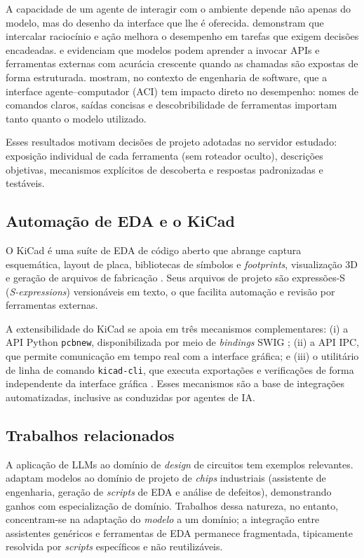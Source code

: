 A capacidade de um agente de interagir com o ambiente depende não apenas do
modelo, mas do desenho da interface que lhe é oferecida. \citet{yao2023react}
demonstram que intercalar raciocínio e ação melhora o desempenho em tarefas
que exigem decisões encadeadas. \citet{schick2023toolformer} e
\citet{patil2023gorilla} evidenciam que modelos podem aprender a invocar APIs
e ferramentas externas com acurácia crescente quando as chamadas são expostas
de forma estruturada. \citet{yang2024sweagent} mostram, no contexto de
engenharia de software, que a interface agente--computador (ACI) tem impacto
direto no desempenho: nomes de comandos claros, saídas concisas e
descobribilidade de ferramentas importam tanto quanto o modelo utilizado.

Esses resultados motivam decisões de projeto adotadas no servidor estudado:
exposição individual de cada ferramenta (sem roteador oculto), descrições
objetivas, mecanismos explícitos de descoberta e respostas padronizadas e
testáveis.

\subsection{Automação de EDA e o KiCad}

O KiCad é uma suíte de EDA de código aberto que abrange captura esquemática,
layout de placa, bibliotecas de símbolos e \emph{footprints}, visualização 3D e
geração de arquivos de fabricação \citep{kicaddocs}. Seus arquivos de projeto
são expressões-S (\emph{S-expressions}) versionáveis em texto, o que facilita
automação e revisão por ferramentas externas.

A extensibilidade do KiCad se apoia em três mecanismos complementares:
(i) a API Python \texttt{pcbnew}, disponibilizada por meio de \emph{bindings}
SWIG \citep{swig}; (ii) a API IPC, que permite comunicação em tempo real com a
interface gráfica; e (iii) o utilitário de linha de comando \texttt{kicad-cli},
que executa exportações e verificações de forma independente da interface
gráfica \citep{kicadcli,kicaddev}. Esses mecanismos são a base de integrações
automatizadas, inclusive as conduzidas por agentes de IA.

\subsection{Trabalhos relacionados}

A aplicação de LLMs ao domínio de \emph{design} de circuitos tem exemplos
relevantes. \citet{liu2023chipnemo} adaptam modelos ao domínio de projeto de
\emph{chips} industriais (assistente de engenharia, geração de \emph{scripts}
de EDA e análise de defeitos), demonstrando ganhos com especialização de
domínio. Trabalhos dessa natureza, no entanto, concentram-se na adaptação do
\emph{modelo} a um domínio; a integração entre assistentes genéricos e
ferramentas de EDA permanece fragmentada, tipicamente resolvida por
\emph{scripts} específicos e não reutilizáveis.

